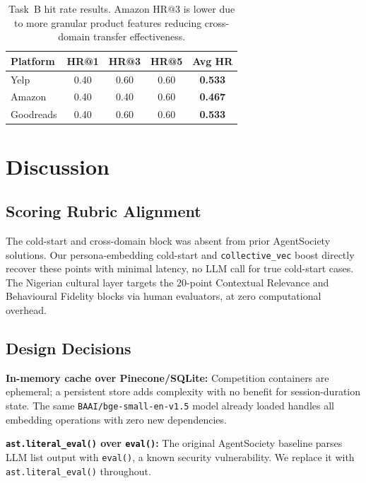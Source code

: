 \documentclass[11pt]{article}
\begin{document}
\begin{table}[h]
\centering
\small
\begin{tabular}{lcccc}
\toprule
\textbf{Platform} & \textbf{HR@1} & \textbf{HR@3} & \textbf{HR@5} & \textbf{Avg HR} \\
\midrule
Yelp      & 0.40 & 0.60 & 0.60 & \textbf{0.533} \\
Amazon    & 0.40 & 0.40 & 0.60 & \textbf{0.467} \\
Goodreads & 0.40 & 0.60 & 0.60 & \textbf{0.533} \\
\bottomrule
\end{tabular}
\caption{Task~B hit rate results. Amazon HR@3 is lower due to more granular product features reducing cross-domain transfer effectiveness.}
\label{tab:task_b}
\end{table}

\section{Discussion}

\subsection{Scoring Rubric Alignment}
The cold-start and cross-domain block was absent from prior AgentSociety solutions. Our persona-embedding cold-start and \texttt{collective\_vec} boost directly recover these points with minimal latency, no LLM call for true cold-start cases. The Nigerian cultural layer targets the 20-point Contextual Relevance and Behavioural Fidelity blocks via human evaluators, at zero computational overhead.

\subsection{Design Decisions}
\noindent\textbf{In-memory cache over Pinecone/SQLite:} \mbox{Competition} containers are ephemeral; a persistent store adds complexity with no benefit for session-duration state. The same \texttt{BAAI/bge-small-en-v1.5} model already loaded handles all embedding operations with zero new dependencies.

\noindent\textbf{\texttt{ast.literal\_eval()} over \texttt{eval()}:} The original AgentSociety baseline parses LLM list output with \texttt{eval()}, a known security vulnerability. We replace it with \texttt{ast.literal\_eval()} throughout.
\end{document}
